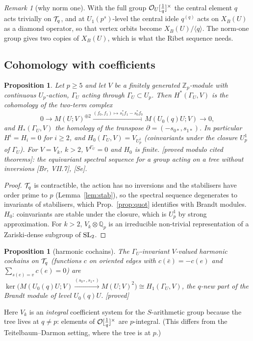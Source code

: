 \documentclass[11pt]{amsart}
\theoremstyle{plain}
\newtheorem{proposition}[theorem]{Proposition}
\theoremstyle{definition}
\theoremstyle{remark}
\newtheorem{remark}[theorem]{Remark}
\newcommand{\status}[1]{\textup{\textsf{[#1]}}}
\newcommand{\stproved}{\status{proved}}
\newcommand{\stpmc}{\status{proved modulo cited theorems}}
\newcommand{\Q}{\mathbb{Q}}\newcommand{\Z}{\mathbb{Z}}\newcommand{\R}{\mathbb{R}}\newcommand{\C}{\mathbb{C}}
\begin{document}
\begin{remark}[why norm one]\label{rem:normone}
With the full group $\mathcal{O}_U[\frac1q]^\times$ the central element $q$ acts trivially on $\mathcal{T}_q$, and at $U_1(p^s)$-level the central idele $q^{(q)}$ acts on $X_B(U)$ as a diamond operator, so that vertex orbits become $X_B(U)/\langle q\rangle$. The norm-one group gives two copies of $X_B(U)$, which is what the Ribet sequence needs.
\end{remark}

\subsection{Cohomology with coefficients}
\begin{proposition}\label{prop:coh}
Let $p\ge5$ and let $V$ be a finitely generated $\Z_p$-module with continuous $U_p$-action, $\Gamma_U$ acting through $\Gamma_U\subset U_p$. Then $H^*(\Gamma_U,V)$ is the cohomology of the two-term complex
\[0\to M(U;V)^{\oplus2}\xrightarrow{(f_0,f_1)\mapsto s_1^*f_1-s_0^*f_0}M(U_0(q)U;V)\to0,\]
and $H_*(\Gamma_U,V)$ the homology of the transpose $\partial=(-s_{0*},s_{1*})$. In particular $H^i=H_i=0$ for $i\ge2$, and $H_0(\Gamma_U,V)=V_{U^1_p}$ (coinvariants under the closure $U_p^1$ of $\Gamma_U$). For $V=V_k$, $k>2$, $V^{\Gamma_U}=0$ and $H_0$ is finite. \stpmc: the equivariant spectral sequence for a group acting on a tree without inversions [Br, VII.7], [Se].
\end{proposition}
\begin{proof}
$\mathcal{T}_q$ is contractible, the action has no inversions and the stabilisers have order prime to $p$ (Lemma~\ref{lem:stab}), so the spectral sequence degenerates to invariants of stabilisers, which Prop.~\ref{prop:quot} identifies with Brandt modules. $H_0$: coinvariants are stable under the closure, which is $U_p^1$ by strong approximation. For $k>2$, $V_k\otimes\Q_p$ is an irreducible non-trivial representation of a Zariski-dense subgroup of $\mathrm{SL}_2$.
\end{proof}

\begin{proposition}[harmonic cochains]\label{prop:harm}
The $\Gamma_U$-invariant $V$-valued harmonic cochains on $\mathcal{T}_q$ (functions $c$ on oriented edges with $c(\bar e)=-c(e)$ and $\sum_{s(e)=v}c(e)=0$) are $\ker\big(M(U_0(q)U;V)\xrightarrow{(s_{0*},s_{1*})}M(U;V)^2\big)\cong H_1(\Gamma_U,V)$, the $q$-new part of the Brandt module of level $U_0(q)U$. \stproved
\end{proposition}
Here $V_k$ is an \emph{integral} coefficient system for the $S$-arithmetic group because the tree lives at $q\ne p$: elements of $\mathcal{O}[\frac1q]^\times$ are $p$-integral. (This differs from the Teitelbaum--Darmon setting, where the tree is at $p$.)
\end{document}
